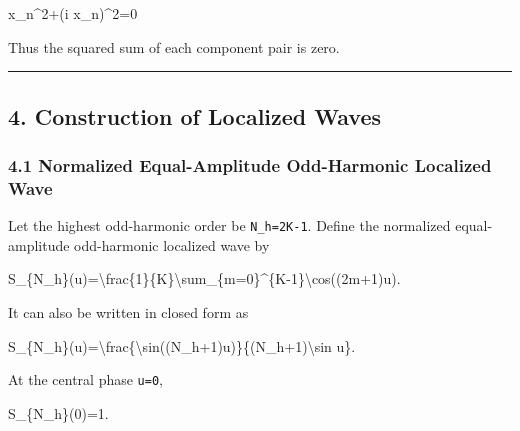 \documentclass[
  a4paper,
]{article}
\newenvironment{Shaded}{}{}
\newcommand{\NormalTok}[1]{#1}
\begin{document}
\begin{Shaded}
\begin{Highlighting}[]
\NormalTok{x\_n\^{}2+(i x\_n)\^{}2=0}
\end{Highlighting}
\end{Shaded}

Thus the squared sum of each component pair is zero.

\begin{center}\rule{0.5\linewidth}{0.5pt}\end{center}

\subsection{4. Construction of Localized
Waves}\label{construction-of-localized-waves}

\subsubsection{4.1 Normalized Equal-Amplitude Odd-Harmonic Localized
Wave}\label{normalized-equal-amplitude-odd-harmonic-localized-wave}

Let the highest odd-harmonic order be \texttt{N\_h=2K-1}. Define the
normalized equal-amplitude odd-harmonic localized wave by

\begin{Shaded}
\begin{Highlighting}[]
\NormalTok{S\_\{N\_h\}(u)=\textbackslash{}frac\{1\}\{K\}\textbackslash{}sum\_\{m=0\}\^{}\{K{-}1\}\textbackslash{}cos((2m+1)u).}
\end{Highlighting}
\end{Shaded}

It can also be written in closed form as

\begin{Shaded}
\begin{Highlighting}[]
\NormalTok{S\_\{N\_h\}(u)=\textbackslash{}frac\{\textbackslash{}sin((N\_h+1)u)\}\{(N\_h+1)\textbackslash{}sin u\}.}
\end{Highlighting}
\end{Shaded}

At the central phase \texttt{u=0},

\begin{Shaded}
\begin{Highlighting}[]
\NormalTok{S\_\{N\_h\}(0)=1.}
\end{Highlighting}
\end{Shaded}
\end{document}
